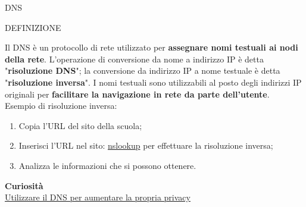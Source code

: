 \documentclass[aspectratio=1610, handout]{beamer}
\begin{document}
\begin{frame}{DNS}
    \begin{alertblock}{DEFINIZIONE}
        \begin{minipage}{0.98\linewidth}
            \justifying
            Il DNS è un protocollo di rete utilizzato per \textbf{assegnare nomi testuali ai 
            nodi della rete}. L'operazione di conversione da nome a indirizzo IP è detta 
            "\textbf{risoluzione DNS}"; la conversione da indirizzo IP a nome testuale è detta "\textbf{risoluzione 
            inversa}". I nomi testuali sono utilizzabili al posto degli indirizzi IP originali per 
            \textbf{facilitare la navigazione in rete da parte dell'utente}.\\
            \bigskip
            Esempio di risoluzione inversa:
            \begin{enumerate}
                \pause
                \item Copia l'URL del sito della scuola;
                \pause
                \item Inserisci l'URL nel sito: \href{https://www.nslookup.io/}{nslookup} per effettuare la risoluzione inversa;
                \pause
                \item Analizza le informazioni che si possono ottenere. 
            \end{enumerate}
            \bigskip
            \tiny{\textbf{Curiosità}}\\
            \tiny{\href{https://adguard-dns.io/it/welcome.html}{Utilizzare il DNS per aumentare la propria privacy}}            
        \end{minipage}
    \end{alertblock}
\end{frame}
\end{document}
